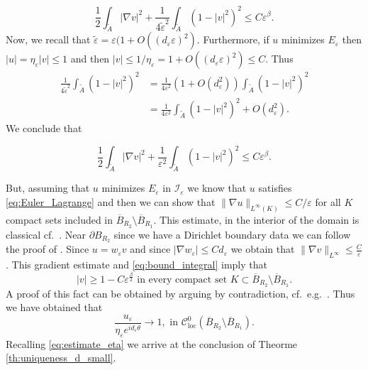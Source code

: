 \documentclass[12pt,reqno]{amsart}
\def\A{{\tilde{A}}}
\def\C{{\mathcal C}}
\def\I{{\mathcal I}}
\def\e {{\varepsilon}}
\def \p {\partial}
\newcommand{\remy}[1]{{\color{magenta} #1 }}
\numberwithin{equation}{section}
\begin{document}
\begin{equation*}
\frac12 \int_{\A}|\nabla v|^2+\frac{1}{4\tilde{\e}^2}\int_{\A}(1-|v|^2)^2\leq C\e^\beta.
\end{equation*}
Now, we recall that \(\tilde{\e}=\e(1+O((d_\e \e)^2)\). Furthermore, if \(u\) minimizes \(E_\e\) then \(|u|=\eta_\e |v|\leq 1\) and then \(|v|\leq 1/\eta_\e=1+O((d_\e \e)^2)\leq C\). Thus
\begin{align*}
\frac{1}{4\tilde{\e}^2}\int_{\A}(1-|v|^2)^2 &= \frac{1}{4\e^2}(1+O(d_\e^2))\int_{\A} (1-|v|^2)^2 \\
&=\frac{1}{4\e^2}\int_{\A} (1-|v|^2)^2+O(d_\e^2).
\end{align*} We conclude that 

\begin{equation*}\label{eq:bound_integral}
\frac12 \int_{\A}|\nabla v|^2+\frac{1}{\e^2}\int_{\A}(1-|v|^2)^2\leq C\e^\beta.
\end{equation*}

But, assuming that \(u\) minimizes \(E_\e\) in \(\I_\e\) we know that \(u\) satisfies \eqref{eq:Euler_Lagrange} and then we can show that \(\|\nabla u\|_{L^\infty(K)}\leq C/\e\) for all \(K\) compact sets included in \(\overline{B}_{R_2}\setminus \overline{B}_{R_1}\). This estimate, in the interior of the domain is classical cf.\ \cite[Step A.1]{BBH_93}. Near \(\p B_{R_2}\) since we have a Dirichlet boundary data we can follow the proof of \cite[Equation (33)]{BBH_93}.
 Since \(u=w_\e v\) and since \(|\nabla w_\e|\leq Cd_\e\) we obtain that \(\|\nabla v\|_{L^\infty}\leq \frac{C}{\e}\). This gradient estimate and \eqref{eq:bound_integral} imply that 
\begin{equation}\label{eq:unif_conv_v}
|v|\geq 1-C\e^{\frac{\beta}{2}} \text{ in every compact set } K \subset \overline{B}_{R_2}\setminus \overline{B}_{R_1}.
\end{equation}
A proof of this fact can be obtained by arguing by contradiction, cf.\ e.g.\ \cite[Step A.2]{BBH_93}. 
\medskip
Thus we have obtained that 
\begin{equation*}
 \frac{u_\e}{\eta_\e e^{id_\e\theta}} \rightarrow 1, \text{ in } \C^0_{\text{loc}}(\overline{B}_{R_2}\setminus \overline{B}_{R_1}).
 \end{equation*}
Recalling \eqref{eq:estimate_eta} we arrive at the conclusion of Theorme \ref{th:uniqueness_d_small}.
\end{document}
